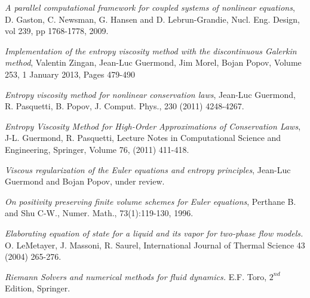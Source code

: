 \documentclass[12pt]{article}
\begin{document}
\begin{thebibliography}{7}
    
  \emph{A parallel computational framework for coupled systems of nonlinear equations},
  D. Gaston, C. Newsman, G. Hansen and D. Lebrun-Grandie, Nucl. Eng. Design, vol 239, pp 1768-1778, 2009.
  
  \emph{Implementation of the entropy viscosity method with the discontinuous Galerkin method},
  Valentin Zingan, Jean-Luc Guermond, Jim Morel, Bojan Popov, Volume 253, 1 January 2013, Pages 479-490
  
  {\em Entropy viscosity method for nonlinear conservation laws}, 
  Jean-Luc Guermond, R. Pasquetti, B. Popov, J. Comput. Phys., 230 (2011) 4248-4267.
  
  {\em Entropy Viscosity Method for High-Order Approximations of Conservation Laws}, 
  J-L. Guermond, R. Pasquetti, 
  Lecture Notes in Computational Science and Engineering, Springer, Volume 76, (2011) 411-418.
  
  \emph{Viscous regularization of the Euler equations and entropy principles},
  Jean-Luc Guermond and Bojan Popov, under review.
  
  \emph{On positivity preserving finite volume schemes for Euler equations},
  Perthane B. and Shu C-W., Numer. Math., 73(1):119-130, 1996.
  
  \emph{Elaborating equation of state for a liquid and its vapor for two-phase flow models.}
  O. LeMetayer, J. Massoni, R. Saurel, International Journal of Thermal Science 43 (2004) 265-276.

  \emph{Riemann Solvers and numerical methods for fluid dynamics.}
  E.F. Toro, $2^{nd}$ Edition, Springer.  
  
  
  \end{thebibliography}
\end{document}
